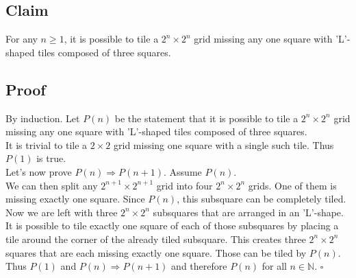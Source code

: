 \documentclass{article}
\begin{document}
\subsection*{Claim}
For any $n\geq 1$, it is possible to tile a $2^n\times 2^n$  grid missing any one square with 'L'-shaped tiles composed of three squares.
\subsection*{Proof}
By induction. Let $P(n)$ be the statement that it is possible to tile a $2^n\times 2^n$ grid missing any one square with 'L'-shaped tiles composed of three squares.\\
It is trivial to tile a $2\times 2$ grid missing one square with a single such tile. Thus $P(1)$ is true.\\
Let's now prove $P(n)\Rightarrow P(n+1)$.
Assume $P(n)$.\\
We can then split any $2^{n+1}\times 2^{n+1}$ grid into four $2^n\times 2^n$ grids. One of them is missing exactly one square.
Since $P(n)$, this subsquare can be completely tiled.
Now we are left with three $2^n\times 2^n$ subsquares that are arranged in an 'L'-shape.
It is possible to tile exactly one square of each of those subsquares by placing a tile around the corner of the already tiled subsquare.
This creates three $2^{n}\times 2^{n}$ squares that are each missing exactly one square. Those can be tiled by $P(n)$.\\
Thus $P(1)$ and $P(n)\Rightarrow P(n+1)$ and therefore $P(n)$ for all $n\in\mathbb{N}$. $\square$
\end{document}
